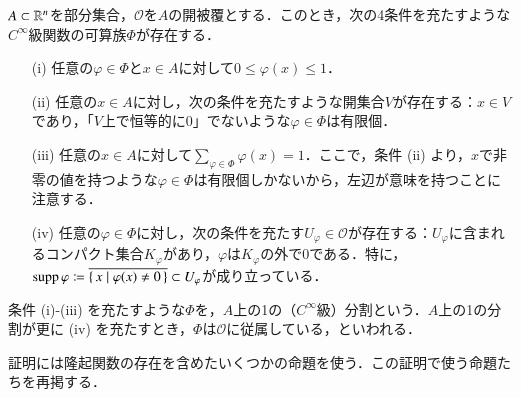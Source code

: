 \begin{thm}[1の分割]
$A \subset \mathbb{R}^n$を部分集合，$\mathscr{O}$を$A$の開被覆とする．このとき，次の4条件を充たすような$C^\infty$級関数の可算族$\Phi$が存在する．
\begin{enumerate}
\item[(i)] 任意の$\varphi \in \Phi$と$x \in A$に対して$0 \leq \varphi(x) \leq 1$．
\item[(ii)] 任意の$x \in A$に対し，次の条件を充たすような開集合$V$が存在する：$x \in V$であり，「$V$上で恒等的に0」でないような$\varphi \in \Phi$は有限個．
\item[(iii)] 任意の$x \in A$に対して$\sum_{\varphi \in \Phi} \varphi(x) =1$．ここで，条件 (ii) より，$x$で非零の値を持つような$\varphi  \in \Phi$は有限個しかないから，左辺が意味を持つことに注意する．
\item[(iv)] 任意の$\varphi \in \Phi$に対し，次の条件を充たす$U_{\varphi} \in \mathscr{O}$が存在する：$U_{\varphi}$に含まれるコンパクト集合$K_{\varphi}$があり，$\varphi$は$K_{\varphi}$の外で0である．特に，$\operatorname{supp} \varphi \coloneqq \overline{\set{ x | \varphi(x) \neq 0 }} \subset U_{\varphi}$が成り立っている．
\end{enumerate}
条件 (i)-(iii) を充たすような$\Phi$を，$A$上の1の（$C^\infty$級）分割という．$A$上の1の分割が更に (iv) を充たすとき，$\Phi$は$\mathscr{O}$に従属している，といわれる．
\end{thm}

証明には隆起関数の存在を含めたいくつかの命題を使う．この証明で使う命題たちを再掲する．

\nonadjustedbump*

\adjustedbump*


